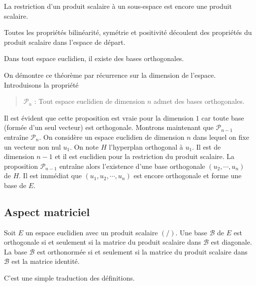 \begin{prop}
 La restriction d'un produit scalaire à un sous-espace est encore une produit scalaire.
\end{prop}
\begin{demo}
 Toutes les propriétés bilinéarité, symétrie et positivité découlent des propriétés du produit scalaire dans l'espace de départ.
\end{demo}

\begin{thm}
Dans tout espace euclidien, il existe des bases orthogonales.
\end{thm}
\begin{demo}
 On démontre ce théorème par récurrence sur la dimension de l'espace. Introduisons la propriété
\begin{quote}
 $\mathcal{P}_n$ : Tout espace euclidien de dimension $n$ admet des bases orthogonales.
\end{quote}
Il est évident que cette proposition est vraie pour la dimension $1$ car toute base (formée d'un seul vecteur) est orthogonale.\newline
Montrons maintenant que $\mathcal{P}_{n-1}$ entraîne $\mathcal{P}_{n}$.\newline
On considère un espace euclidien de dimension $n$ dans lequel on fixe un vecteur non nul $u_1$. On note $H$ l'hyperplan orthogonal à $u_1$. Il est de dimension $n-1$ et il est euclidien pour la restriction du produit scalaire. La proposition $\mathcal{P}_{n-1}$ entraîne alors l'existence d'une base orthogonale $(u_2,\cdots,u_n)$ de $H$. Il est immédiat que $(u_1,u_2,\cdots,u_n)$ est encore orthogonale et forme une base de $E$.
\end{demo}

\subsection{Aspect matriciel}
\begin{prop}
 Soit $E$ un espace euclidien avec un produit scalaire $(/ )$. Une base $\mathcal B$ de $E$ est orthogonale si et seulement si la matrice du produit scalaire dans $\mathcal B$ est diagonale. La base $\mathcal B$ est orthonormée si et seulement si la matrice du produit scalaire dans $\mathcal B$ est la matrice identité.
\end{prop}
\begin{demo}
  C'est une simple traduction des définitions.
\end{demo}


